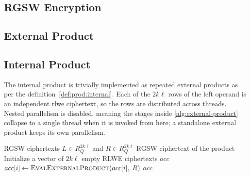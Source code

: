 \subsection{RGSW Encryption}


\subsection{External Product}


\subsection{Internal Product}
The internal product is trivially implemented as repeated external products as per the definition~\autoref{def:prod:internal}. Each of the $2k\ell$ rows of the left operand is an independent \gls{rlwe} ciphertext, so the rows are distributed across threads. Nested parallelism is disabled, meaning the stages inside \autoref{alg:external-product} collapse to a single thread when it is invoked from here; a standalone external product keeps its own parallelism.

\begin{algorithm}
\caption{Internal Product}
\label{alg:internal-product}
\begin{algorithmic}[1]
\Require RGSW ciphertexts $L \in R_Q^{2k\ell}$ and $R \in R_Q^{2k\ell}$
\Ensure RGSW ciphertext of the product
\State Initialize a vector of $2k\ell$ empty RLWE ciphertexts $acc$
\For{$i \gets [0, 2k\ell)$ \textbf{in parallel}}
    \State $acc[i] \gets \Call{EvalExternalProduct}{acc[i],\; R}$
\EndFor
\State \Return $acc$
\end{algorithmic}
\end{algorithm}

